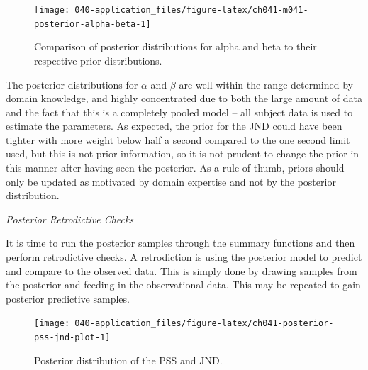 \documentclass[11pt, oneside, openany]{scrbook}
\newenvironment{Shaded}{\begin{snugshade}}{\end{snugshade}}
\newcommand{\FloatTok}[1]{\textcolor[rgb]{0.00,0.00,0.81}{#1}}
\newcommand{\FunctionTok}[1]{\textcolor[rgb]{0.13,0.29,0.53}{\textbf{#1}}}
\newcommand{\NormalTok}[1]{#1}
\newcommand{\OtherTok}[1]{\textcolor[rgb]{0.56,0.35,0.01}{#1}}
\newcommand{\SpecialCharTok}[1]{\textcolor[rgb]{0.81,0.36,0.00}{\textbf{#1}}}
\begin{document}
\begin{figure}

{\centering \texttt{[image: 040-application\_files/figure-latex/ch041-m041-posterior-alpha-beta-1]} 

}

\caption{Comparison of posterior distributions for alpha and beta to their respective prior distributions.}\label{fig:ch041-m041-posterior-alpha-beta}
\end{figure}

The posterior distributions for \(\alpha\) and \(\beta\) are well within the range determined by domain knowledge, and highly concentrated due to both the large amount of data and the fact that this is a completely pooled model -- all subject data is used to estimate the parameters. As expected, the prior for the JND could have been tighter with more weight below half a second compared to the one second limit used, but this is not prior information, so it is not prudent to change the prior in this manner after having seen the posterior. As a rule of thumb, priors should only be updated as motivated by domain expertise and not by the posterior distribution.

\emph{Posterior Retrodictive Checks}

It is time to run the posterior samples through the summary functions and then perform retrodictive checks. A retrodiction is using the posterior model to predict and compare to the observed data. This is simply done by drawing samples from the posterior and feeding in the observational data. This may be repeated to gain posterior predictive samples.


\begin{Shaded}
\end{Shaded}


\begin{figure}

{\centering \texttt{[image: 040-application\_files/figure-latex/ch041-posterior-pss-jnd-plot-1]} 

}

\caption{Posterior distribution of the PSS and JND.}\label{fig:ch041-posterior-pss-jnd-plot}
\end{figure}
\end{document}
